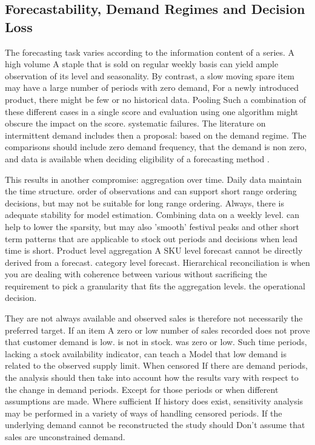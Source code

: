\documentclass[a4paper,11pt,oneside]{book}
\theoremstyle{plain}
\theoremstyle{definition}
\theoremstyle{remark}
\begin{document}
\subsection{Forecastability, Demand Regimes and Decision Loss}

The forecasting task varies according to the information content of a series. A high volume A staple that is sold on regular weekly basis can yield ample observation of its level and seasonality. By contrast, a slow moving spare item may have a large number of periods with zero demand, For a newly introduced product, there might be few or no historical data. Pooling Such a combination of these different cases in a single score and evaluation using one algorithm might obscure the impact on the score. systematic failures. The literature on intermittent demand includes then a proposal: based on the demand regime. The comparisons should include zero demand frequency, that the demand is non zero, and data is available when deciding eligibility of a forecasting method \cite{croston1972intermittent,syntetos2005intermittent}.

This results in another compromise: aggregation over time. Daily data maintain the time structure. order of observations and can support short range ordering decisions, but may not be suitable for long range ordering. Always, there is adequate stability for model estimation. Combining data on a weekly level. can help to lower the sparsity, but may also 'smooth' festival peaks and other short term patterns that are applicable to stock out periods and decisions when lead time is short. Product level aggregation A SKU level forecast cannot be directly derived from a forecast. category level forecast. Hierarchical reconciliation is when you are dealing with coherence between various without sacrificing the requirement to pick a granularity that fits the aggregation levels. the operational decision.

They are not always available and observed sales is therefore not necessarily the preferred target. If an item A zero or low number of sales recorded does not prove that customer demand is low. is not in stock. was zero or low. Such time periods, lacking a stock availability indicator, can teach a Model that low demand is related to the observed supply limit. When censored If there are demand periods, the analysis should then take into account how the results vary with respect to the change in demand periods. Except for those periods or when different assumptions are made. Where sufficient If history does exist, sensitivity analysis may be performed in a variety of ways of handling censored periods. If the underlying demand cannot be reconstructed the study should Don't assume that sales are unconstrained demand.
\end{document}
